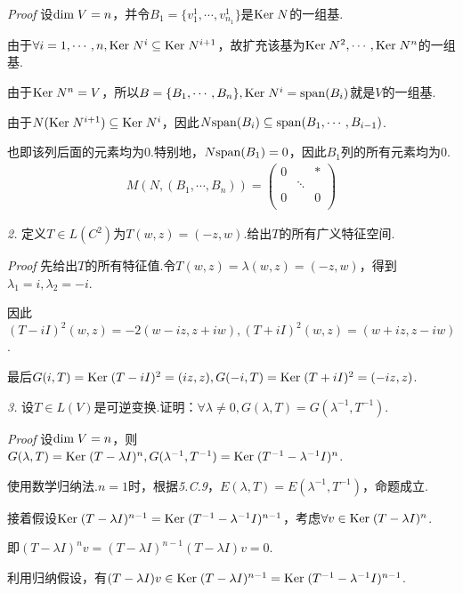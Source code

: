 \textit{Proof}
设\(\mathrm{dim \;} V=n\)，并令\(B_1=\{v_1^1,\cdots,v_{n_1}^1\}\)是\(\mathrm{Ker \;} N\)的一组基.

由于\(\forall i=1,\cdots,n,\mathrm{Ker \;} N^i \subseteq \mathrm{Ker \;} N^{i+1}\)，故扩充该基为\(\mathrm{Ker \;} N^2,\cdots,\mathrm{Ker \;} N^n\)的一组基.

由于\(\mathrm{Ker \;} N^n=V\)，所以\(B=\{B_1,\cdots,B_n\},\mathrm{Ker \;} N^i=\mathrm{span}(B_i)\)就是\(V\)的一组基.

由于\(N(\mathrm{Ker \;} N^{i+1}) \subseteq \mathrm{Ker \;} N^i\)，因此\(N \mathrm{span}(B_i) \subseteq \mathrm{span}(B_1,\cdots,B_{i-1})\).

也即该列后面的元素均为\(0\).特别地，\(N \mathrm{span}(B_1)=0\)，因此\(B_1\)列的所有元素均为\(0\).
    \begin{align*}
        M(N,(B_1,\cdots,B_n))=
        \begin{pmatrix}
                0 &        & * \\
                  & \ddots &   \\
                0 &        & 0 \\
        \end{pmatrix}
    \end{align*}

\newpage

\textit{2.}
定义\(T \in L(C^2)\)为\(T(w,z)=(-z,w)\).给出\(T\)的所有广义特征空间.

\textit{Proof}
先给出\(T\)的所有特征值.令\(T(w,z)=\lambda(w,z)=(-z,w)\)，得到\(\lambda_1=i,\lambda_2=-i\).

因此\((T-iI)^2(w,z)=-2(w-iz,z+iw),(T+iI)^2(w,z)=(w+iz,z-iw)\).

最后\(G(i,T)=\mathrm{Ker \;} (T-iI)^2=(iz,z),G(-i,T)=\mathrm{Ker \;} (T+iI)^2=(-iz,z)\).

\hspace*{\fill}

\textit{3.}
设\(T \in L(V)\)是可逆变换.证明：\(\forall \lambda \ne 0,G(\lambda,T)=G(\lambda^{-1},T^{-1})\).

\textit{Proof}
设\(\mathrm{dim \;} V=n\)，则\(G(\lambda,T)=\mathrm{Ker \;} (T-\lambda I)^n,G(\lambda^{-1},T^{-1})=\mathrm{Ker \;} (T^{-1}-\lambda^{-1} I)^n\).

使用数学归纳法.\(n=1\)时，根据\textit{5.C.9}，\(E(\lambda,T)=E(\lambda^{-1},T^{-1})\)，命题成立.

接着假设\(\mathrm{Ker \;} (T-\lambda I)^{n-1}=\mathrm{Ker \;} (T^{-1}-\lambda^{-1} I)^{n-1}\)，考虑\(\forall v \in \mathrm{Ker \;} (T-\lambda I)^n\).

即\((T-\lambda I)^n v=(T-\lambda I)^{n-1}(T-\lambda I)v=0\).

利用归纳假设，有\((T-\lambda I)v \in \mathrm{Ker \;} (T-\lambda I)^{n-1}=\mathrm{Ker \;} (T^{-1}-\lambda^{-1} I)^{n-1}\).

